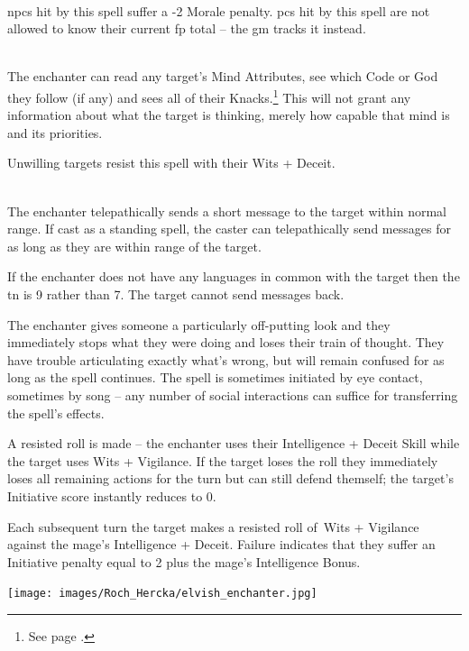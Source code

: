 \documentclass[titlepage,a4paper,openany]{book}
\begin{document}
\begin{multicols}{2}
{\\
\Glspl{npc} hit by this spell suffer a -2 Morale penalty.  \Glspl{pc} hit by this spell are not allowed to know their current \gls{fp} total -- the \gls{gm} tracks it instead.

\\
The enchanter can read any target's Mind Attributes, see which Code or God they follow (if any) and sees all of their Knacks.\footnote{See page \pageref{gods_codes}.}
This will not grant any information about what the target is thinking, merely how capable that mind is and its priorities.

Unwilling targets resist this spell with their Wits + Deceit.

\\
The enchanter telepathically sends a short message to the target within normal range. If cast as a standing spell, the caster can telepathically send messages for as long as they are within range of the target.

If the enchanter does not have any languages in common with the target then the \gls{tn} is 9 rather than 7. The target cannot send messages back.

\spelllevel


The enchanter gives someone a particularly off-putting look and they immediately stops what they were doing and loses their train of thought.
They have trouble articulating exactly what's wrong, but will remain confused for as long as the spell continues.
The spell is sometimes initiated by eye contact, sometimes by song -- any number of social interactions can suffice for transferring the spell's effects.

A resisted roll is made -- the enchanter uses their Intelligence + Deceit Skill while the target uses Wits + Vigilance.
If the target loses the roll they immediately loses all remaining actions for the turn but can still defend themself; the target's Initiative score instantly reduces to 0.

Each subsequent turn the target makes a resisted roll of\ Wits + Vigilance against the mage's Intelligence + Deceit. Failure indicates that they suffer an Initiative penalty equal to 2 plus the mage's Intelligence Bonus.

	\texttt{[image: images/Roch\_Hercka/elvish\_enchanter.jpg]}
	\label{roch:enchanter}
}{}


\end{multicols}
\end{document}
